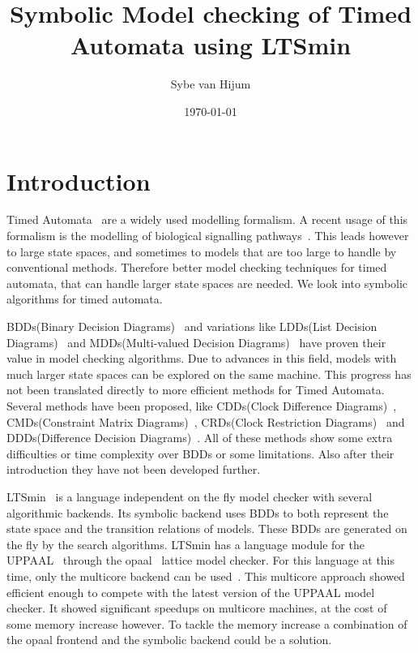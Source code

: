 \documentclass[11pt]{article}
\begin{document}
\newtheorem{mydef}{Definition}
\title{Symbolic Model checking of Timed Automata using LTSmin}
\author{Sybe van Hijum}
\date{\today}
\maketitle

\tableofcontents

\section{Introduction}
Timed Automata~\cite{Alur1994183} are a widely used modelling formalism. A recent usage of this formalism is the modelling of biological signalling pathways~\cite{DBLP:conf/bibe/SchivoSWCVKLPP12}. This leads however to large state spaces, and sometimes to models that are too large to handle by conventional methods. Therefore better model checking techniques for timed automata, that can handle larger state spaces are needed. We look into symbolic algorithms for timed automata.

BDDs(Binary Decision Diagrams)~\cite{?} and variations like LDDs(List Decision Diagrams)~\cite{so62465} and MDDs(Multi-valued Decision Diagrams)~\cite{129849} have proven their value in model checking algorithms. Due to advances in this field, models with much larger state spaces can be explored on the same machine. This progress has not been translated directly to more efficient methods for Timed Automata. Several methods have been proposed, like CDDs(Clock Difference Diagrams)~\cite{BRICS19491}, CMDs(Constraint Matrix Diagrams)~\cite{5702245}, CRDs(Clock Restriction Diagrams)~\cite{crds} and DDDs(Difference Decision Diagrams)~\cite{ddds, ddd-datastructure-99}. All of these methods show some extra difficulties or time complexity over BDDs or some limitations. Also after their introduction they have not been developed further.

LTSmin~\cite{eemcs18152,ltsmin-mc:nmf2011} is a language independent on the fly model checker with several algorithmic backends. Its symbolic backend uses BDDs to both represent the state space and the transition relations of models. These BDDs are generated on the fly by the search algorithms. LTSmin has a language module for the UPPAAL~\cite{UPPAAL} through the opaal~\cite{opaal} lattice model checker. For this language at this time, only the multicore backend can be used~\cite{eemcs21972}. This multicore approach showed efficient enough to compete with the latest version of the UPPAAL model checker. It showed significant speedups on multicore machines, at the cost of some memory increase however. To tackle the memory increase a combination of the opaal frontend and the symbolic backend could be a solution.
\end{document}
